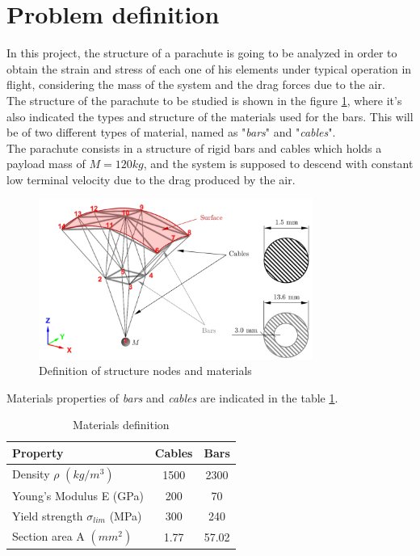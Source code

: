\section{Problem definition}

In this project, the structure of a parachute is going to be analyzed in order
to obtain the strain and stress of each one of his elements under typical
operation in flight, considering the mass of the system and the drag forces
due to the air.\\

The structure of the parachute to be studied is shown in the figure \ref{fig:definition},
where it's also indicated the types and structure of the materials used for the
bars. This will be of two different types of material, named as "\textit{bars}" and
"\textit{cables}".\\

The parachute consists in a structure of rigid bars and cables which holds a
payload mass of $M = 120kg$, and the system is supposed to descend with constant
low terminal velocity due to the drag produced by the air.

\begin{figure}[h]
	\centering
	\includegraphics[width=0.8\textwidth]{img/parachute_definition.png}
	\caption{Definition of structure nodes and materials}
	\label{fig:definition}
\end{figure}

Materials properties of \textit{bars} and \textit{cables} are indicated in the
table \ref{tab:materials}.

\begin{table}[h]
\centering
\begin{tabular}{|p{6cm}|c|c|}
\hline
\textbf{Property}  			& \textbf{Cables} & \textbf{Bars} \\ \hline
Density $\rho$ $(kg/m^3)$		& 1500		& 2300	\\ \hline
Young's Modulus E (GPa)			& 200		& 70	\\ \hline
Yield strength $\sigma_{lim}$ (MPa)	& 300		& 240	\\ \hline
Section area A $(mm^2)$			& 1.77		& 57.02	\\ \hline
\end{tabular}
\caption{Materials definition}
\label{tab:materials}
\end{table}

